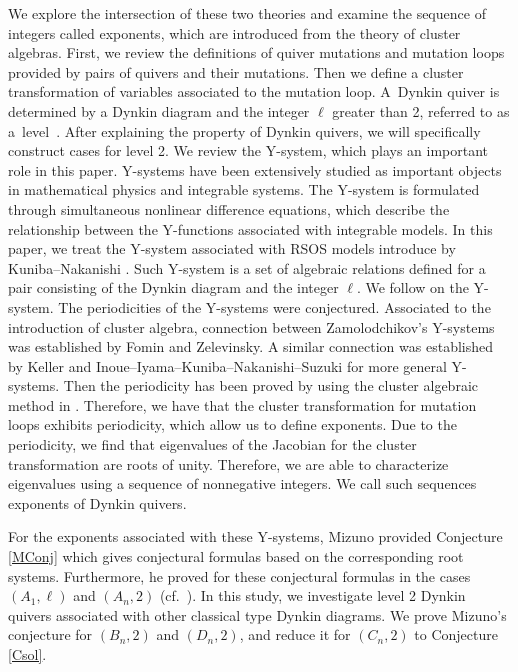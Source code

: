 \documentclass[pdftex]{sigma}
\numberwithin{equation}{section}
\begin{document}
We explore the intersection of these two theories and examine the sequence of integers called exponents, which are introduced from the theory of cluster algebras.
First, we review the definitions of quiver mutations and mutation loops provided by pairs of quivers and their mutations.
Then we define a cluster transformation of variables associated to the mutation loop.
A~Dynkin quiver is determined by a Dynkin diagram and the integer $\ell$ greater than 2, referred to as a~level~\mbox{\cite{IIKKN, IIKKN2}}.
After explaining the property of Dynkin quivers, we will specifically construct cases for level 2.
We review the Y-system, which plays an important role in this paper.
Y-systems have been extensively studied as important objects in mathematical physics and integrable systems.
The Y-system is formulated through simultaneous nonlinear difference equations, which describe the relationship between the Y-functions associated with integrable models.
In this paper, we treat the Y-system associated with RSOS models introduce by Kuniba--Nakanishi \cite{KN}.
Such Y-system is a set of algebraic relations defined for a pair consisting of the Dynkin diagram and the integer $\ell$.
We follow \cite{KNS} on the Y-system.
The periodicities of the Y-systems were conjectured.
Associated to the introduction of cluster algebra, connection between Zamolodchikov's Y-systems was established by Fomin and Zelevinsky.
A similar connection was established by Keller and Inoue--Iyama--Kuniba--Nakanishi--Suzuki for more general Y-systems.
Then the periodicity has been proved by using the cluster algebraic method in \cite{IIKKN, IIKKN2, K}.
Therefore, we have that the cluster transformation for mutation loops exhibits periodicity, which allow us to define exponents.
Due to the periodicity, we find that eigenvalues of the Jacobian for the cluster transformation are roots of unity.
Therefore, we are able to characterize eigenvalues using a sequence of nonnegative integers.
We call such sequences exponents of Dynkin quivers.

For the exponents associated with these Y-systems, Mizuno provided Conjecture \ref{MConj} which gives conjectural formulas based on the corresponding root systems.
Furthermore, he proved for these conjectural formulas in the cases $(A_1,\ell)$ and $(A_n,2)$ (cf.\ \cite{M}).
In this study, we investigate level 2 Dynkin quivers associated with other classical type Dynkin diagrams.
We prove Mizuno's conjecture for $(B_n,2)$ and $(D_n,2)$, and reduce it for $(C_n,2)$ to Conjecture \ref{Csol}.
	
\end{document}
